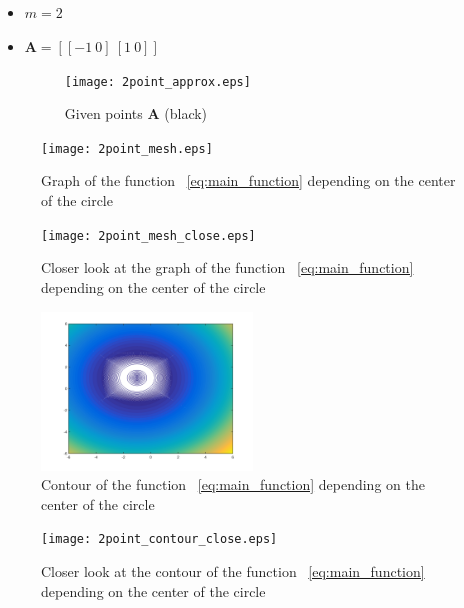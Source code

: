 \documentclass[]{scrartcl}
\begin{document}
 \clearpage
\subsection{}\label{section_2}
 \begin{itemize}
 	\item $m = 2$ 
 	\item $ \mathbf{A} = [[-1 \: 0] \: [1 \: 0]] $
 	\begin{figure}[h]
 		\centering
 		\texttt{[image: 2point\_approx.eps]}
 		\caption{Given points $\mathbf{ A} $ (black)}
 		\label{fig:m2gd}
 	\end{figure}
 \end{itemize}
 \begin{figure}[h]
 	\centering
 	\texttt{[image: 2point\_mesh.eps]}
 	\caption{Graph of the function ~\ref{eq:main_function} depending on the center of the circle}
 	\label{fig:m23d}
 \end{figure}
 \begin{figure}[h]
 	\centering
 	\texttt{[image: 2point\_mesh\_close.eps]}
 	\caption{Closer look at the graph of the function ~\ref{eq:main_function} depending on the center of the circle}
 	\label{fig:m23dc}
 \end{figure}
 \begin{figure}[h]
 	\centering
 	\includegraphics[width=0.5\textwidth]{2point_contour.png}
 	\caption{Contour of the function ~\ref{eq:main_function} depending on the center of the circle}
 	\label{fig:m22d}
 \end{figure}
  \begin{figure}[h]
  	\centering
  	\texttt{[image: 2point\_contour\_close.eps]}
  	\caption{Closer look at the contour of the function ~\ref{eq:main_function} depending on the center of the circle}
  	\label{fig:m22dc}
  \end{figure}
  
 
 \clearpage
\end{document}
